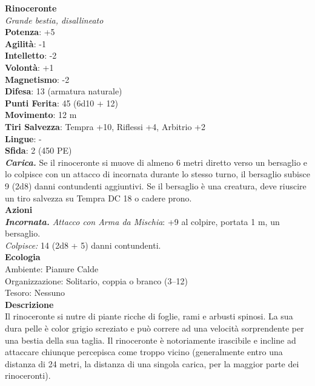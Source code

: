 \begin{multicols}{2}
\medskip\textbf{Rinoceronte}\\
\emph{Grande bestia, disallineato}\\
\textbf{Potenza}: +5\\
\textbf{Agilità}: -1\\
\textbf{Intelletto}: -2\\
\textbf{Volontà}: +1\\
\textbf{Magnetismo}: -2\\
\textbf{Difesa}: 13 (armatura naturale)\\
\textbf{Punti Ferita}: 45 (6d10 + 12)\\
\textbf{Movimento}: 12 m\\
\textbf{Tiri Salvezza}: Tempra +10, Riflessi +4, Arbitrio +2\\
\textbf{Lingue}: -\\
\textbf{Sfida}: 2 (450 PE)\smallskip\\
\emph{\textbf{Carica.}} Se il rinoceronte si muove di almeno 6 metri diretto verso un bersaglio e lo colpisce con un attacco di incornata durante lo stesso turno, il bersaglio subisce 9 (2d8) danni contundenti aggiuntivi. Se il bersaglio è una creatura, deve riuscire un tiro salvezza su Tempra DC  18 o cadere prono.\\
\smallskip\textbf{Azioni}\\
\emph{\textbf{Incornata.} Attacco con Arma da Mischia}: +9 al colpire, portata 1 m, un bersaglio.\\
\emph{Colpisce:} 14 (2d8 + 5) danni contundenti.\\
\textbf{Ecologia}\\
Ambiente: Pianure Calde\\
Organizzazione: Solitario, coppia o branco (3–12)\\
Tesoro: Nessuno\\
\textbf{Descrizione}\\

Il rinoceronte si nutre di piante ricche di foglie, rami e arbusti spinosi. La sua dura pelle è color grigio screziato e può correre ad una velocità sorprendente per una bestia della sua taglia. Il rinoceronte è notoriamente irascibile e incline ad attaccare chiunque percepisca come troppo vicino (generalmente entro una distanza di 24 metri, la distanza di una singola carica, per la maggior parte dei rinoceronti). \\





\end{multicols}
